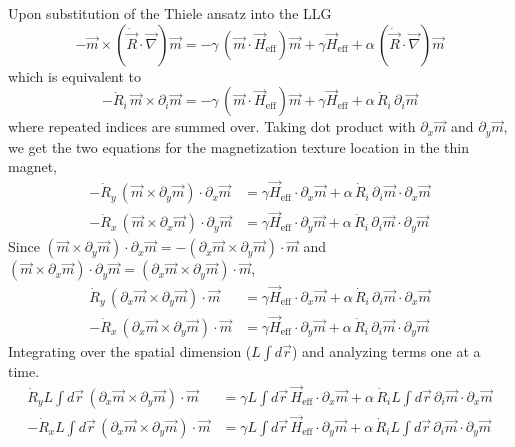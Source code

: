 \documentclass[aps,prb,onecolumn,notitlepage,showpacs,floatfix,superscriptaddress]{revtex4-1}
\newcommand{\mrm}[1]{\mathrm{#1}}
\begin{document}
Upon substitution of the Thiele ansatz into the LLG
\begin{equation}
-\vec{m} \times (\dot{\vec{R}}\cdot \vec{\nabla}) \vec{m} = -\gamma \, (\vec{m} \cdot \vec{H}_\mrm{eff}) \vec{m} + \gamma \vec{H}_\mrm{eff} + \alpha \, (\dot{\vec{R}}\cdot \vec{\nabla})\vec{m}
\end{equation}
which is equivalent to
\begin{equation}
-\dot{R}_i \, \vec{m} \times \partial_i \vec{m} = -\gamma \, (\vec{m} \cdot \vec{H}_\mrm{eff}) \vec{m} + \gamma \vec{H}_\mrm{eff} + \alpha \, \dot{R}_i \, \partial_i \vec{m}
\end{equation}
where repeated indices are summed over. Taking dot product with $\partial_x \vec{m}$ and $\partial_y \vec{m}$, we get the two equations for the magnetization texture location in the thin magnet,
\begin{equation}
\begin{split}
-\dot{R}_y \, (\vec{m} \times \partial_y \vec{m}) \cdot \partial_x \vec{m} &= \gamma \vec{H}_\mrm{eff} \cdot \partial_x \vec{m} + \alpha \, \dot{R}_i \, \partial_i \vec{m} \cdot \partial_x \vec{m} \\
-\dot{R}_x \, (\vec{m} \times \partial_x \vec{m}) \cdot \partial_y \vec{m} &= \gamma \vec{H}_\mrm{eff} \cdot \partial_y \vec{m} + \alpha \, \dot{R}_i \, \partial_i \vec{m} \cdot \partial_y \vec{m}
\end{split}
\end{equation}
Since $(\vec{m} \times \partial_y \vec{m}) \cdot \partial_x \vec{m} = - (\partial_x \vec{m} \times \partial_y \vec{m}) \cdot  \vec{m}$ and $(\vec{m} \times \partial_x \vec{m}) \cdot \partial_y \vec{m} =  (\partial_x \vec{m} \times \partial_y \vec{m}) \cdot  \vec{m}$,
\begin{equation}
\begin{split}
\dot{R}_y \, (\partial_x \vec{m} \times \partial_y \vec{m}) \cdot  \vec{m} &= \gamma \vec{H}_\mrm{eff} \cdot \partial_x \vec{m} + \alpha \, \dot{R}_i \, \partial_i \vec{m} \cdot \partial_x \vec{m} \\
-\dot{R}_x \, (\partial_x \vec{m} \times \partial_y \vec{m}) \cdot  \vec{m} &= \gamma \vec{H}_\mrm{eff} \cdot \partial_y \vec{m} + \alpha \, \dot{R}_i \, \partial_i \vec{m} \cdot \partial_y \vec{m}
\end{split}
\end{equation}
Integrating over the spatial dimension ($L\int d\vec{r}$) and analyzing terms one at a time. 
\begin{equation}
\begin{split}
\dot{R}_y L\int d\vec{r}\,(\partial_x \vec{m} \times \partial_y \vec{m}) \cdot  \vec{m} &= \gamma L\int d\vec{r}\,\vec{H}_\mrm{eff} \cdot \partial_x \vec{m} + \alpha \, \dot{R}_i L\int d\vec{r}\, \partial_i \vec{m} \cdot \partial_x \vec{m} \\
-\dot{R}_x L\int d\vec{r}\, (\partial_x \vec{m} \times \partial_y \vec{m}) \cdot  \vec{m} &= \gamma L\int d\vec{r}\,\vec{H}_\mrm{eff} \cdot \partial_y \vec{m} + \alpha \, \dot{R}_i L\int d\vec{r}\, \partial_i \vec{m} \cdot \partial_y \vec{m}
\end{split}
\end{equation}
\end{document}
